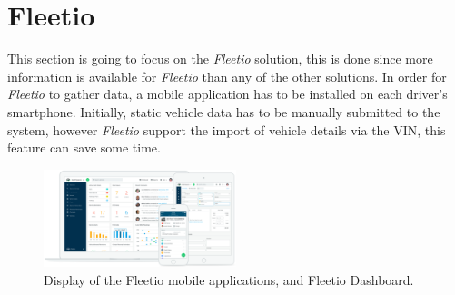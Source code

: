 \section{Fleetio}
This section is going to focus on the \textit{Fleetio} solution, this is done since more information is available for \textit{Fleetio} than any of the other solutions.
In order for \textit{Fleetio} to gather data, a mobile application has to be installed on each driver's smartphone.
Initially, static vehicle data has to be manually submitted to the system, however \textit{Fleetio} support the import of vehicle details via the \ac{VIN}, this feature can save some time.

\begin{figure}[h!]
    \centering
    \includegraphics[width=0.5\textwidth]{img/fleetio.png}
    \caption{Display of the Fleetio mobile applications, and Fleetio Dashboard.}
    \label{fig:Fleetio_Devices}
\end{figure}

